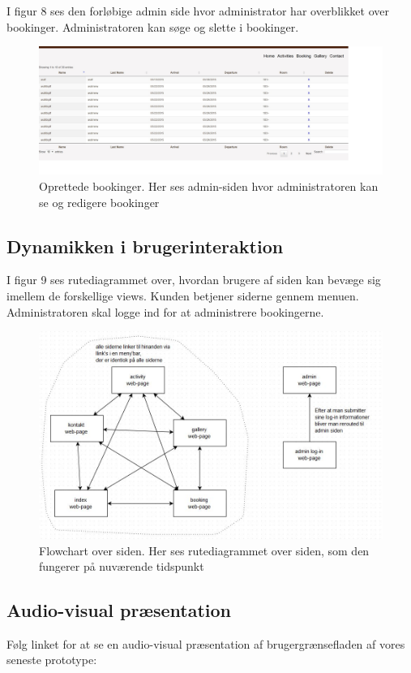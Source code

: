 \documentclass[12pt,a4paper]{article}
\begin{document}
\newpage
I figur 8 ses den forløbige admin side hvor administrator har overblikket
over bookinger. Administratoren kan søge og slette i bookinger. 
\begin{figure}[H]
\centering
\includegraphics[scale=0.4] {brugergransefladebilled3.jpg}
\caption{Oprettede bookinger. Her ses admin-siden hvor administratoren kan se og redigere bookinger}
\end{figure}

\subsection{Dynamikken i brugerinteraktion}
I figur 9 ses rutediagrammet over, 
hvordan brugere af siden kan bevæge sig imellem de forskellige views. 
Kunden betjener siderne gennem menuen.
Administratoren skal logge ind for at administrere bookingerne.
\begin{figure}[H]
\centering
\includegraphics[scale=0.6] {flowchart.jpg}
\caption{Flowchart over siden. Her ses rutediagrammet over siden, som den fungerer på nuværende tidspunkt}
\end{figure}
\newpage
\subsection{Audio-visual præsentation}
Følg linket for at se en audio-visual præsentation af brugergrænsefladen af vores seneste prototype: \\
\end{document}
